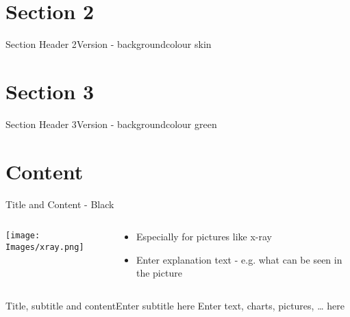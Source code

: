 \documentclass[10pt,compress]{beamer} %
\begin{document}
\section{Section 2}
{
\sectionheaderSkin %
\eliminarNavegacion
\begin{frame}{Section Header 2}{Version - backgroundcolour skin}
\end{frame}
}

\section{Section 3}
{
\sectionheaderGreen %
\begin{frame}{Section Header 3}{Version - backgroundcolour green}
\end{frame}
}

\section{Content}
{\blackSlide %
\begin{frame}{Title and Content - Black}
\begin{columns}
  \begin{column}{0.3\textwidth}
    \begin{center}
     \texttt{[image: Images/xray.png]}
     \end{center}
  \end{column}
  \begin{column}{0.7\textwidth}  %
    \begin{itemize}
	  \item Especially for pictures like x-ray
	  \item Enter explanation text - e.g. what can be seen in the picture
	\end{itemize}
  \end{column}
\end{columns}

\end{frame}
}

\begin{frame}{Title, subtitle and content}{Enter subtitle here}
Enter text, charts, pictures, … here
\end{frame}
\end{document}
